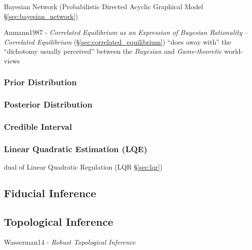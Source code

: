 \fist Bayesian Network (Probabilistic Directed Acyclic Graphical Model
\S\ref{sec:bayesian_network})

\fist Aumann1987 - \emph{Correlated Equilibrium as an Expression of Bayesian
  Rationality} -- \emph{Correlated Equilibrium}
(\S\ref{sec:correlated_equilibrium}) ``does away with'' the ``dichotomy usually
perceived'' between the \emph{Bayesian} and \emph{Game-theoretic} world-views



\subsubsection{Prior Distribution}\label{sec:prior_distribution}

\subsubsection{Posterior Distribution}\label{sec:posterior_distribution}

\subsubsection{Credible Interval}\label{sec:credible_interval}

\subsubsection{Linear Quadratic Estimation (LQE)}\label{sec:lqe}

dual of Linear Quadratic Regulation (LQR \S\ref{sec:lqr})



\subsection{Fiducial Inference}\label{sec:fiducial_inference}

\subsection{Topological Inference}\label{sec:topological_inference}

Wasserman14 - \emph{Robust Topological Inference}

